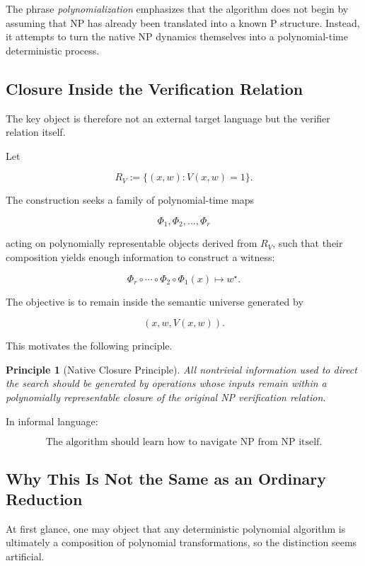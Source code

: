 \documentclass[11pt]{article}
\theoremstyle{plain}
\newtheorem{principle}[theorem]{Principle}
\theoremstyle{definition}
\begin{document}
The phrase \emph{polynomialization} emphasizes that the algorithm does not
begin by assuming that NP has already been translated into a known P
structure.  Instead, it attempts to turn the native NP dynamics themselves
into a polynomial-time deterministic process.

\subsection{Closure Inside the Verification Relation}

The key object is therefore not an external target language but the verifier
relation itself.

Let

\[
    R_V
    :=
    \{(x,w):V(x,w)=1\}.
\]

The construction seeks a family of polynomial-time maps

\[
    \Phi_1,\Phi_2,\dots,\Phi_r
\]

acting on polynomially representable objects derived from \(R_V\), such that
their composition yields enough information to construct a witness:

\[
    \Phi_r\circ\cdots\circ\Phi_2\circ\Phi_1(x)
    \longmapsto
    w^\star.
\]

The objective is to remain inside the semantic universe generated by

\[
    (x,w,V(x,w)).
\]

This motivates the following principle.

\begin{principle}[Native Closure Principle]
\label{principle:native-closure}
All nontrivial information used to direct the search should be generated by
operations whose inputs remain within a polynomially representable closure of
the original NP verification relation.
\end{principle}

In informal language:

\[
\boxed{
\text{The algorithm should learn how to navigate NP from NP itself.}
}
\]

\subsection{Why This Is Not the Same as an Ordinary Reduction}

At first glance, one may object that any deterministic polynomial algorithm
is ultimately a composition of polynomial transformations, so the distinction
seems artificial.
\end{document}
